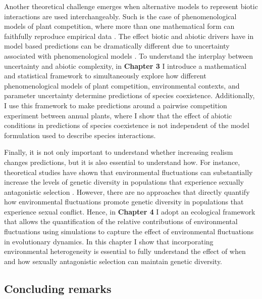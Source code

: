 \documentclass[12pt]{article}
\begin{document}
Another theoretical challenge emerges when alternative models to represent biotic interactions are used interchangeably. Such is the case of phenomenological models of plant competition, where more than one mathematical form can faithfully reproduce empirical data \citep{levine2009importance,godoy_phenology_2014,godoy_phylogenetic_2014,mayfield2017higher,bimler_accurate_2018}. The effect biotic and abiotic drivers have in model based predictions can be dramatically different due to uncertainty associated with phenomenological models \citep{jorgensen2001fundamentals,flora_structural_2011, aldebert_clement_community_2018}. To understand the interplay between uncertainty and abiotic complexity, in \textbf{Chapter 3} I introduce a mathematical and statistical framework to simultaneously explore how different phenomenological models of plant competition, environmental contexts, and parameter uncertainty determine predictions of species coexistence. Additionally, I use this framework to make predictions around a pairwise competition experiment between annual plants, where I show that the effect of abiotic conditions in predictions of species coexistence is not independent of the model formulation used to describe species interactions.

Finally, it is not only important to understand whether increasing realism changes predictions, but it is also essential to understand how. For instance, theoretical studies have shown that environmental fluctuations can substantially increase the levels of genetic diversity in populations that experience sexually antagonistic selection \citep{connallon2012general,connallon_evolutionary_2019,patten2010fitness,jordan2012potential}. However, there are no approaches that directly quantify how environmental fluctuations promote genetic diversity in populations that experience sexual conflict. Hence, in \textbf{Chapter 4} I adopt an ecological framework that allows the quantification of the relative contributions of environmental fluctuations using simulations to capture the effect of environmental fluctuations in evolutionary dynamics. In this chapter I show that incorporating environmental heterogeneity is essential to fully understand the effect of when and how sexually antagonistic selection can maintain genetic diversity.



\subsection*{Concluding remarks}
\end{document}

